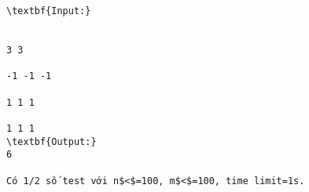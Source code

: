 \begin{verbatim}
\textbf{Input:}


3 3

-1 -1 -1

1 1 1 

1 1 1
\textbf{Output:}
6

Có 1/2 số test với n$<$=100, m$<$=100, time limit=1s.\end{verbatim}